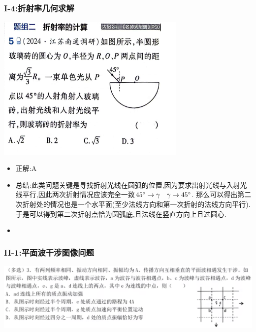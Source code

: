 \documentclass{article}
\begin{document}
\subsubsection{I-4:折射率几何求解}
\includegraphics[width = 25em]{./pictures/2.1-9.png}

\begin{itemize}
    \item 正解:\quad A
    \item 总结:\quad 此类问题关键是寻找折射光线在圆弧的位置,因为要求出射光线与入射光线平行,因此两次折射情况应该完全一致$45^\circ \rightarrow \gamma \quad \gamma \rightarrow 45^\circ$.
    那么可以得出第二次折射处的情况也是一个水平面(至少法线方向和第一次折射的法线方向平行).于是可以得到第二次折射点恰为圆弧底,且法线在竖直方向上且过圆心.
    \item 
\end{itemize}


\vspace{2em}

\subsubsection{II-1:平面波干涉图像问题}
\includegraphics[width = 50em]{./pictures/2.1-3.png}
\end{document}
